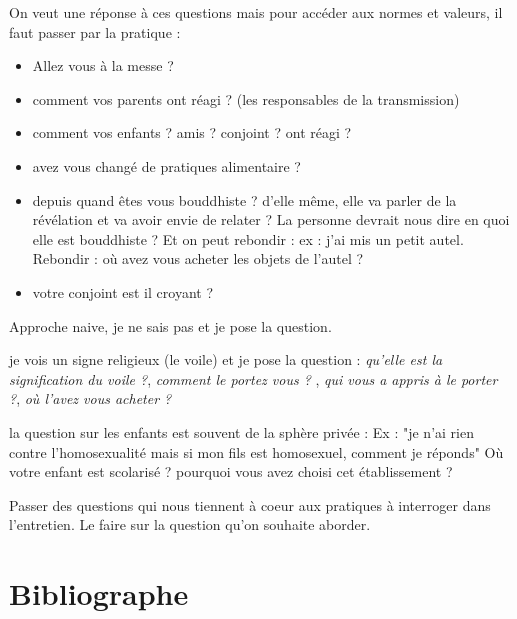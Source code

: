 On veut une réponse à ces questions mais pour accéder aux normes et valeurs, il faut passer par la pratique :
\begin{itemize}
\item Allez vous à la messe ?
\item comment vos parents ont réagi ? (les responsables de la transmission)
\item comment vos enfants ? amis ? conjoint ? ont réagi ?
\item avez vous changé de pratiques alimentaire ? 
\item depuis quand êtes vous bouddhiste ? d'elle même, elle va parler de la révélation et va avoir envie de relater ? La personne devrait nous dire en quoi elle est bouddhiste ? Et on peut rebondir : ex : j'ai mis un petit autel. Rebondir : où avez vous acheter les objets de l'autel ?
\item votre conjoint est il croyant ?

\end{itemize}

\begin{Def}
Approche naive, je ne sais pas et je pose la question.
\end{Def}

je vois un signe religieux (le voile) et je pose la question : \textit{qu'elle est la signification du voile ?}, \textit{comment le portez vous ? }, \textit{qui vous a appris à le porter ?}, \textit{où l'avez vous acheter ?}

\begin{Prop}
la question sur les enfants est souvent de la sphère privée : Ex : "je n'ai rien contre l'homosexualité mais si mon fils est homosexuel, comment je réponds"
Où votre enfant est scolarisé ? pourquoi vous avez choisi cet établissement ?

\end{Prop}

\begin{Exo}
Passer des questions qui nous tiennent à coeur aux pratiques à interroger dans l'entretien.
Le faire sur la question qu'on souhaite aborder.
\end{Exo}

\section{Bibliographe}

